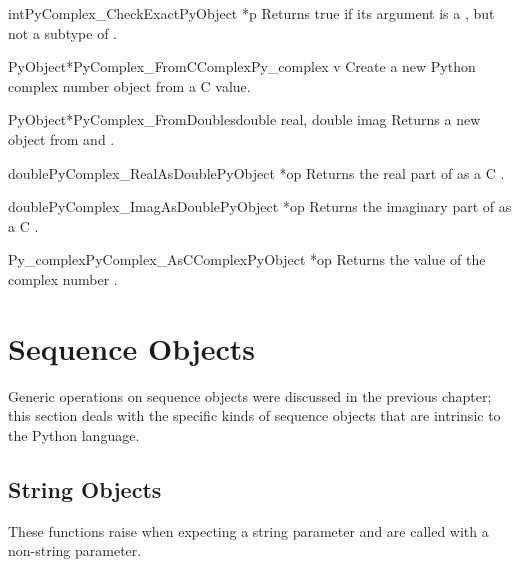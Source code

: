 \begin{cfuncdesc}{int}{PyComplex_CheckExact}{PyObject *p}
  Returns true if its argument is a , but not a
  subtype of .
\end{cfuncdesc}

\begin{cfuncdesc}{PyObject*}{PyComplex_FromCComplex}{Py_complex v}
  Create a new Python complex number object from a C
   value.
\end{cfuncdesc}

\begin{cfuncdesc}{PyObject*}{PyComplex_FromDoubles}{double real, double imag}
  Returns a new  object from  and
  .
\end{cfuncdesc}

\begin{cfuncdesc}{double}{PyComplex_RealAsDouble}{PyObject *op}
  Returns the real part of  as a C .
\end{cfuncdesc}

\begin{cfuncdesc}{double}{PyComplex_ImagAsDouble}{PyObject *op}
  Returns the imaginary part of  as a C .
\end{cfuncdesc}

\begin{cfuncdesc}{Py_complex}{PyComplex_AsCComplex}{PyObject *op}
  Returns the  value of the complex number
  .
\end{cfuncdesc}



\section{Sequence Objects \label{sequenceObjects}}

Generic operations on sequence objects were discussed in the previous
chapter; this section deals with the specific kinds of sequence
objects that are intrinsic to the Python language.


\subsection{String Objects \label{stringObjects}}

These functions raise  when expecting a string
parameter and are called with a non-string parameter.

